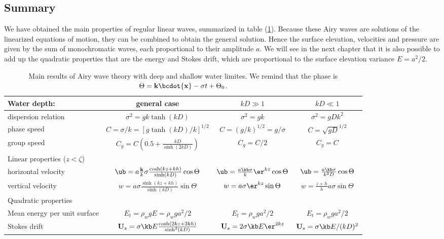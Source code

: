 \subsection{Summary}
We have obtained the main properties of regular linear waves,  summarized in table 
(\ref{table_theory}). Because these Airy waves are solutions of the linearized equations of motion, 
they can be combined to obtain the general solution. Hence the surface elevation, velocities and pressure 
are given by the sum of monochromatic waves, each proportional to their amplitude $a$. We will see in the next chapter that it is also possible to add up the quadratic properties 
that are the energy and Stokes drift, which are  proportional to the surface elevation variance
$E=a^2/2$.
\begin{table}
  \centering
  \begin{tabular}{lccc}
\hline
  Water depth: & general case       & $kD \gg 1$  & $kD \ll 1$  \\
\hline
  dispersion relation  &   $\sigma^2=g k \tanh (kD)  $               & $ \sigma^2=g k$ & $\sigma^2=g D k^2 $ \\
  phase speed & $C= {\sigma}/{k}=\left[g  \tanh (kD)/ k\right]^{1/2}$         & $C=\left(g / k\right)^{1/2} ={g}/{\sigma}  $   & $ C = \sqrt{gD}^{1/2}$ \\
  group speed  &  $C_g=C \left(0.5+\frac{kD}{\sinh(2kD)}\right)  $               & $C_g=C/2 $&
  $C_g=C$\\
\hline
  Linear properties  ($z<\zeta$) &    &  & \\
\hline
  horizontal velocity & $\ub =   a \frac{{\mathbf k}}{k}\sigma
    \frac{\cosh\left(kz+kh\right)}{\sinh\left(kD\right)}
    \cos \Theta $         &  $\ub=\frac{a \kb \sigma}{k} \er^{kz}    \cos \Theta$ & $\ub=\frac{a \kb \sigma}{k^2 D}
        \cos \Theta $\\
  vertical velocity & $w =   a \sigma
    \frac{\sinh\left(kz+kh\right)}{\sinh\left(kD\right)}
    \sin \Theta $         &  $w =a \sigma \er^{kz}    \sin \Theta$ & $w=\frac{z+h}{h}{a \sigma} \sin \Theta $\\
\hline
  Quadratic properties &    &  & \\
\hline
 Mean energy per unit surface & $E_t =  \rho_w g E = \rho_w g a^2 /2$  & $E_t =  \rho_w g  a^2 /2$ & $E_t =  \rho_w g  a^2 /2$ \\
 Stokes drift & ${\mathbf U}_s=\sigma \kb E \frac{\cosh(2kz+2kh)}{\sinh^2(kD)}$  & ${\mathbf U}_s=2 \sigma \kb E \er^{2kz} $ & ${\mathbf U}_s=\sigma \kb E /(kD)^2$ \\
\hline
\end{tabular}
  \caption{Main results of Airy wave theory with deep and shallow water limites.  We remind that the phase is  $\Theta={\mathbf
k}\bcdot{\mathbf x}-\sigma t+ \Theta_0$.
}\label{table_theory}
\end{table}
